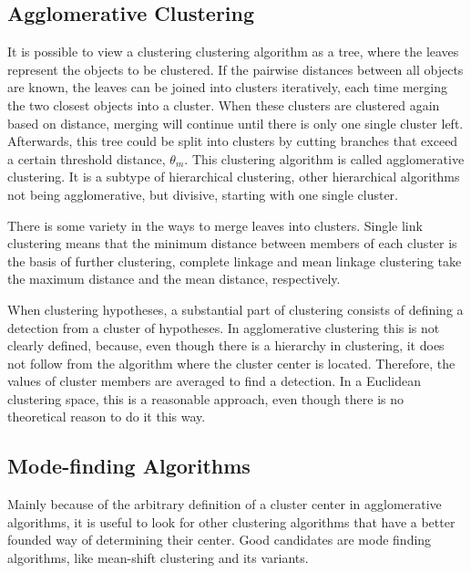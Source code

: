 \subsection{Agglomerative Clustering} %
\label{sub:agglomerative_clustering}

It is possible to view a clustering clustering algorithm as a tree, where the leaves represent the objects to be clustered. If the pairwise distances between all objects are known, the leaves can be joined into clusters iteratively, each time merging the two closest objects into a cluster. When these clusters are clustered again based on distance, merging will continue until there is only one single cluster left. Afterwards, this tree could be split into clusters by cutting branches that exceed a certain threshold distance, $\theta_m$. This clustering algorithm is called agglomerative clustering. It is a subtype of hierarchical clustering, other hierarchical algorithms not being agglomerative, but divisive, starting with one single cluster.

There is some variety in the ways to merge leaves into clusters. Single link clustering means that the minimum distance between members of each cluster is the basis of further clustering, complete linkage and mean linkage clustering take the maximum distance and the mean distance, respectively.

When clustering hypotheses, a substantial part of clustering consists of defining a detection from a cluster of hypotheses. In agglomerative clustering this is not clearly defined, because, even though there is a hierarchy in clustering, it does not follow from the algorithm where the cluster center is located. Therefore, the values of cluster members are averaged to find a detection. \cite{becker2012codebook} In a Euclidean clustering space, this is a reasonable approach, even though there is no theoretical reason to do it this way.


\subsection{Mode-finding Algorithms} %
\label{sub:mode_finding_algorithms}

Mainly because of the arbitrary definition of a cluster center in agglomerative algorithms, it is useful to look for other clustering algorithms that have a better founded way of determining their center. Good candidates are mode finding algorithms, like mean-shift clustering and its variants. \cite{cheng1995mean,vedaldi2008quick}

